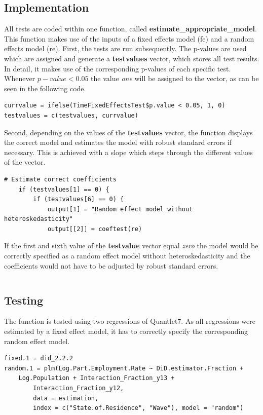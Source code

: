 \documentclass[a4paper]{article}
\begin{document}
{\subsection{Implementation}
All tests are coded within one function, called \textbf{estimate\_appropriate\_model}. This function makes use of the inputs of a fixed effects model (fe) and a random effects model (re). First, the tests are run subsequently. The p-values are used which are assigned and generate a \textbf{testvalues} vector, which stores all test results. In detail, it makes use of the corresponding p-values of each specific test. Whenever $p-value < 0.05$ the value \textit{one} will be assigned to the vector, as can be seen in the following code.
\begin{lstlisting}
currvalue = ifelse(TimeFixedEffectsTest$p.value < 0.05, 1, 0)
testvalues = c(testvalues, currvalue)
\end{lstlisting}
Second, depending on the values of the \textbf{testvalues} vector, the function displays the correct model and estimates the model with robust standard errors if necessary. This is achieved with a slope which steps through the different values of the vector.
\begin{lstlisting}
# Estimate correct coefficients
    if (testvalues[1] == 0) {
        if (testvalues[6] == 0) {
            output[1] = "Random effect model without heteroskedasticity"
            output[[2]] = coeftest(re)
\end{lstlisting}
If the first and sixth value of the \textbf{testvalue} vector equal \textit{zero} the model would be correctly specified as a random effect model without heteroskedasticity and the coefficients would not have to be adjusted by robust standard errors.

\begin{lstlisting}
\end{lstlisting}

\subsection{Testing}
The function is tested using two regressions of Quantlet7.
As all regressions were estimated by a fixed effect model, it has to correctly specify the corresponding random effect model.

\begin{lstlisting}
fixed.1 = did_2.2.2
random.1 = plm(Log.Part.Employment.Rate ~ DiD.estimator.Fraction + 
	Log.Population + Interaction_Fraction_y13 + 
    	Interaction_Fraction_y12, 
    	data = estimation, 
    	index = c("State.of.Residence", "Wave"), model = "random")
        

\end{lstlisting}}
\end{document}
